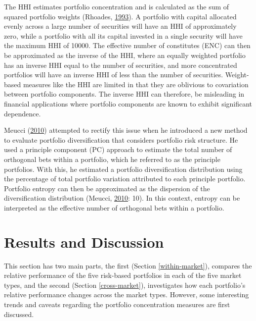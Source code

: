 \documentclass[11pt,preprint, authoryear]{elsarticle}
\numberwithin{equation}{section}
\numberwithin{figure}{section}
\numberwithin{table}{section}
\begin{document}
The HHI estimates portfolio concentration and is calculated as the sum
of squared portfolio weights (Rhoades,
\protect\hyperlink{ref-rhoades1993}{1993}). A portfolio with capital
allocated evenly across a large number of securities will have an HHI of
approximately zero, while a portfolio with all its capital invested in a
single security will have the maximum HHI of 10000. The effective number
of constitutes (ENC) can then be approximated as the inverse of the HHI,
where an equally weighted portfolio has an inverse HHI equal to the
number of securities, and more concentrated portfolios will have an
inverse HHI of less than the number of securities. Weight-based measures
like the HHI are limited in that they are oblivious to covariation
between portfolio components. The inverse HHI can therefore, be
misleading in financial applications where portfolio components are
known to exhibit significant dependence.

Meucci (\protect\hyperlink{ref-meucci2010}{2010}) attempted to rectify
this issue when he introduced a new method to evaluate portfolio
diversification that considers portfolio risk structure. He used a
principle component (PC) approach to estimate the total number of
orthogonal bets within a portfolio, which he referred to as the
principle portfolios. With this, he estimated a portfolio
diversification distribution using the percentage of total portfolio
variation attributed to each principle portfolio. Portfolio entropy can
then be approximated as the dispersion of the diversification
distribution (Meucci, \protect\hyperlink{ref-meucci2010}{2010}: 10). In
this context, entropy can be interpreted as the effective number of
orthogonal bets within a portfolio.

\newpage

\hypertarget{results-and-discussion}{%
\section{\texorpdfstring{Results and Discussion
\label{reasults}}{Results and Discussion }}\label{results-and-discussion}}

This section has two main parts, the first (Section
\ref{within-market}), compares the relative performance of the five
risk-based portfolios in each of the five market types, and the second
(Section \ref{cross-market}), investigates how each portfolio's relative
performance changes across the market types. However, some interesting
trends and caveats regarding the portfolio concentration measures are
first discussed.
\end{document}
